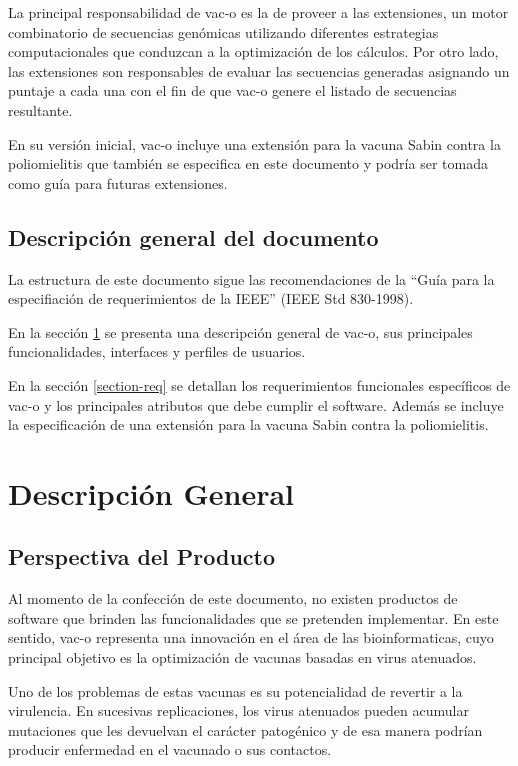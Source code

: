 \documentclass[10pt,a4paper]{article}
\begin{document}
  La principal responsabilidad de vac-o es la de proveer a las extensiones, un motor combinatorio de secuencias gen\'omicas utilizando diferentes estrategias computacionales que conduzcan a la optimizaci\'on de los c\'alculos. Por otro lado, las extensiones son responsables de evaluar las secuencias generadas asignando un puntaje a cada una con el fin de que vac-o genere el listado de secuencias resultante.

  En su versi\'on inicial, vac-o incluye una extensi\'on para la vacuna Sabin contra la poliomielitis que tambi\'en se especifica en este documento y podr\'ia ser tomada como gu\'ia para futuras extensiones.

  \subsection{Descripci\'on general del documento}
  La estructura de este documento sigue las recomendaciones de la ``Gu\'ia para la especifiaci\'on de requerimientos de la IEEE'' (IEEE Std 830-1998).

  En la secci\'on \ref{section-desc-gral} se presenta una descripci\'on general de vac-o, sus principales funcionalidades, interfaces y perfiles de usuarios.
  
  En la secci\'on \ref{section-req} se detallan los requerimientos funcionales espec\'ificos de vac-o y los principales atributos que debe cumplir el software. Adem\'as se incluye la especificaci\'on de una extensi\'on para la vacuna Sabin contra la poliomielitis.

\section{Descripci\'on General}
  \label{section-desc-gral}
  \subsection{Perspectiva del Producto}   
    Al momento de la confecci\'on de este documento, no existen productos de software que brinden las funcionalidades que se pretenden implementar. En este sentido, vac-o representa una innovaci\'on en el \'area de las bioinformaticas, cuyo principal objetivo es la optimizaci\'on de vacunas basadas en virus atenuados.
    
    Uno de los problemas de estas vacunas es su potencialidad de revertir a la virulencia. En sucesivas replicaciones, los virus atenuados pueden acumular mutaciones que les devuelvan el car\'acter patog\'enico y de esa manera podr\'ian producir enfermedad en el vacunado o sus contactos.
    
\end{document}
